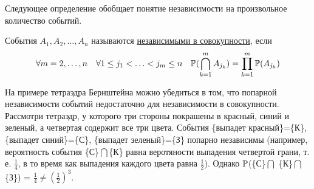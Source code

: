 \documentclass[../TV&MS.tex]{subfiles}
\begin{document}
Следующее определение обобщает понятие независимости на произвольное количество событий.
\begin{Def}
События $A_1, A_2, \dots, A_n$ называются \underline{независимыми в совокупности}, если 
$$\forall m = 2, \dots, n \quad \forall 1 \le j_1 < \ldots < j_m \le n \quad 
\mathbb{P}(\bigcap_{k=1}^{m}A_{j_k})=\prod_{k=1}^{m} \mathbb{P}(A_{j_k})$$
\end{Def}
\begin{Ex}
На примере тетраэдра Бернштейна можно убедиться в том, что попарной независимости событий недостаточно для независимости в совокупности. Рассмотри тетраэдр, у 
которого три стороны покрашены в красный, синий и зеленый, а четвертая содержит все три цвета. События \{выпадет красный\}=\{К\}, \{выпадет синий\}=\{С\}, \{выпадет зеленый\}=\{З\}
попарно независимы (например, вероятность события \{С\}$\bigcap$\{К\} равна веротяности выпадения четвертой грани, т. е. $\frac{1}{4}$, в то время как выпадения 
каждого цвета равна $\frac12$). Однако $\mathbb{P}$(\{С\}$\bigcap$ \{К\}$\bigcap$ \{З\}) = $\frac14 \not= (\frac12)^3$.
\end{Ex}
\newpage
\end{document}

